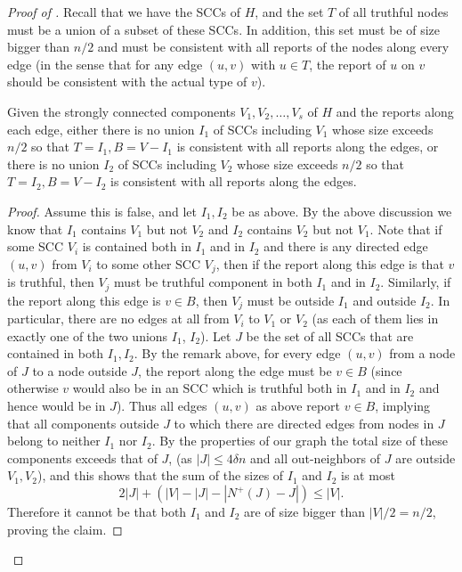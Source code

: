 \documentclass{toc}
\begin{document}
\begin{proof}[Proof of ]
Recall that we have the SCCs of $H$, and the set $T$ of all truthful
nodes must be a union of a subset of these SCCs.
In addition, this set must be of size bigger than $n/2$ and must be
consistent with all reports of the nodes along every edge (in
the sense that for any edge $(u,v)$ with $u \in T$, the report of
$u$ on $v$ should be consistent with the actual type of $v$).

\begin{claim}
\label{c28}
Given the strongly connected components $V_1,V_2, \ldots ,V_s$
of $H$ and the reports along each edge, either there is no 
union $I_1$ of SCCs including 
$V_1$ whose size exceeds $n/2$ so that $T=I_1,
B=V-I_1$ is
consistent with all reports along the edges, or there is no union
$I_2$ of SCCs including $V_2$ whose size exceeds $n/2$ so that 
$T=I_2,B=V-I_2$ is consistent with all reports along the edges. 
\end{claim}
\vspace{0.1cm}

\begin{proof}
Assume this is false, and let $I_1, I_2$ be as above.
By the above discussion we know that $I_1$ contains
$V_1$ but not $V_2$ and $I_2$ contains $V_2$ but not $V_1$.
Note that if some SCC $V_i$ is contained both in $I_1$ and in $I_2$ 
and there is any directed edge $(u,v)$ from $V_i$ to some other SCC
$V_j$, then if the report along this edge is that $v$ is truthful,
then $V_j$ must be  truthful  component in both $I_1$ and in $I_2$.
Similarly, if the report along this edge is $v \in B$, then $V_j$
must be outside $I_1$ and outside $I_2$. In particular, there are
no edges at all from $V_i$  to  $V_1$ or $V_2$ (as each of them
lies in exactly one of the two unions $I_1$, $I_2$). Let $J$ be the
set of all SCCs that are contained in both $I_1,I_2$. By the remark
above, for every edge $(u,v)$ from a node of $J$ to a node outside $J$,
the report along the edge must be  $v \in B$ (since otherwise $v$
would also be in an SCC which is truthful both in $I_1$ and in
$I_2$ and hence would be in $J$). Thus all edges $(u,v)$ as above
report $v \in B$, implying that all components outside $J$ 
to which there are
directed edges from nodes in $J$  belong to neither $I_1$ nor
$I_2$. By the properties of our graph the total size of these
components exceeds that of $J$, (as $|J| \leq 4 \delta n$ and all
out-neighbors of $J$ are outside $V_1,V_2$), and this shows that
the sum of the sizes of $I_1$ and $I_2$ is at  most
$$
2|J| +(|V|-|J|-|N^+(J)-J|) \leq |V|.
$$
Therefore  it cannot be that both $I_1$ and $I_2$ are of size bigger
than $|V|/2=n/2$, proving the claim.
\end{proof}


\end{proof}
\end{document}
